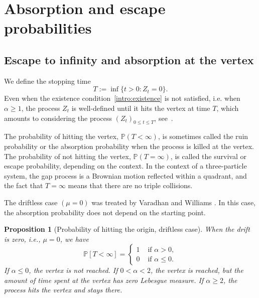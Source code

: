 \documentclass[11pt]{article}
\newtheorem{prop}[thm]{Proposition}
\theoremstyle{definition}
\begin{document}
\section{Absorption and escape probabilities}
\label{sec:absesc}

\subsection{Escape to infinity and absorption at the vertex}

We define the stopping time
$$
T:=\inf \{t>0: Z_t=0\} .
$$
Even when the existence condition~\eqref{intro:existence} is not satisfied, i.e. when $\alpha \geqslant 1$, the process $Z_t$ is well-defined until it hits the vertex at time $T$, which amounts to considering the process $\left({Z}_t\right)_{0 \leqslant t \leqslant T}$, see~\cite{taylor_existence_1993,lakner2023,franceschi_ernst_huang_escape_2021}. 

The probability of hitting the vertex,
$
\mathbb{P}(T<\infty)
$,
is sometimes called the ruin probability or the absorption probability when the process is killed at the vertex. The probability of not hitting the vertex, $\mathbb{P}(T=\infty)$, is called the survival or escape probability, depending on the context. In the context of a three-particle system, the gap process is a Brownian motion reflected within a quadrant, and the fact that $T=\infty$ means that there are no triple collisions. 

The driftless case $(\mu=0)$ was treated by Varadhan and Williams \cite{varadhan_brownian_1985}.  
In this case, the absorption probability does not depend on the starting point.
\begin{prop}[Probability of hitting the origin, driftless case]%
When the drift is zero, i.e., $\mu=0$, we have
$$
\mathbb{P}[T<\infty]= \begin{cases}1 & \text { if } \alpha>0, \\ 0 & \text { if } \alpha \leqslant 0. \end{cases}
$$
If $\alpha \leqslant 0$, the vertex is not reached.  
If $0<\alpha<2$, the vertex is reached, but the amount of time spent at the vertex has zero Lebesgue measure.  
If $\alpha \geqslant 2$, the process hits the vertex and stays there.
\end{prop}
\end{document}
